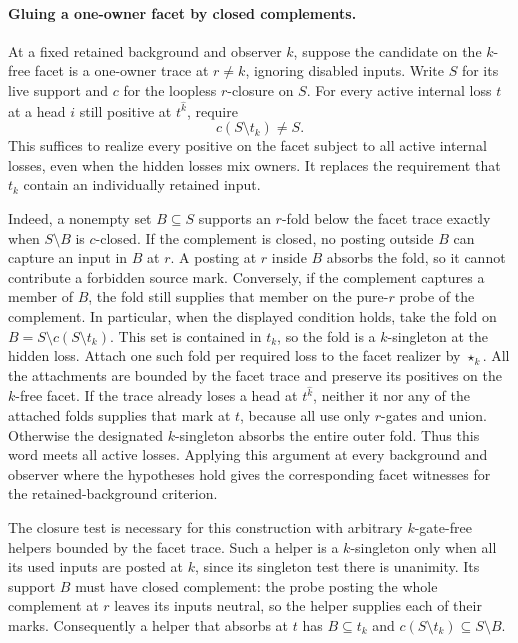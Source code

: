 \paragraph{Gluing a one-owner facet by closed complements.}
At a fixed retained background and observer $k$, suppose
the candidate on the $k$-free facet is a one-owner trace
at $r\ne k$, ignoring disabled inputs. Write $S$ for
its live support and $c$ for the loopless $r$-closure on
$S$. For every active internal loss $t$ at a head $i$
still positive at $t^{\widehat k}$, require
\[
                     c(S\setminus t_k)\ne S.
\]
This suffices to realize every positive on the facet
subject to all active internal losses, even when the
hidden losses mix owners. It replaces the requirement
that $t_k$ contain an individually retained input.

Indeed, a nonempty set $B\subseteq S$ supports an
$r$-fold below the facet trace exactly when $S\setminus
B$ is $c$-closed. If the complement is closed, no
posting outside $B$ can capture an input in $B$ at
$r$. A posting at $r$ inside $B$ absorbs the fold, so
it cannot contribute a forbidden source mark.
Conversely, if the complement captures a member of
$B$, the fold still supplies that member on the
pure-$r$ probe of the complement. In particular, when
the displayed condition holds, take the fold on
$B=S\setminus c(S\setminus t_k)$. This set is contained
in $t_k$, so the fold is a $k$-singleton at the hidden
loss. Attach one such fold per required loss to the
facet realizer by $\star_k$. All the attachments are
bounded by the facet trace and preserve its positives
on the $k$-free facet. If the trace already loses a
head at $t^{\widehat k}$, neither it nor any of the
attached folds supplies that mark at $t$, because all
use only $r$-gates and union. Otherwise the designated
$k$-singleton absorbs the entire outer fold. Thus this
word meets all active losses. Applying this argument
at every background and observer where the hypotheses
hold gives the corresponding facet witnesses for the
retained-background criterion.

The closure test is necessary for this construction
with arbitrary $k$-gate-free helpers bounded by the
facet trace. Such a helper is a $k$-singleton only
when all its used inputs are posted at $k$, since its
singleton test there is unanimity. Its support $B$
must have closed complement: the probe posting the
whole complement at $r$ leaves its inputs neutral, so
the helper supplies each of their marks. Consequently
a helper that absorbs at $t$ has $B\subseteq t_k$ and
$c(S\setminus t_k)\subseteq S\setminus B$.

